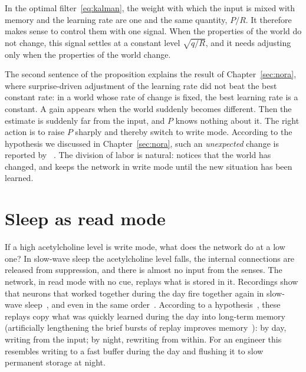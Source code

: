 \begin{keyblock}
\begin{proposition}
\label{prop:kalman}
In the optimal filter~\eqref{eq:kalman}, the weight with which the input is mixed with memory and the learning rate are one and the same quantity, $P/R$. It therefore makes sense to control them with one signal. When the properties of the world do not change, this signal settles at a constant level $\sqrt{q/R}$, and it needs adjusting only when the properties of the world change.
\end{proposition}
\end{keyblock}

The second sentence of the proposition explains the result of Chapter~\ref{sec:nora}, where surprise-driven adjustment of the learning rate did not beat the best constant rate: in a world whose rate of change is fixed, the best learning rate is a constant. A gain appears when the world suddenly becomes different. Then the estimate is suddenly far from the input, and $P$ knows nothing about it. The right action is to raise $P$ sharply and thereby switch to write mode. According to the hypothesis we discussed in Chapter~\ref{sec:nora}, such an \emph{unexpected} change is reported by ~\cite{YuDayan2005}. The division of labor is natural:  notices that the world has changed, and  keeps the network in write mode until the new situation has been learned.

\section{Sleep as read mode}

If a high acetylcholine level is write mode, what does the network do at a low one? In slow-wave sleep the acetylcholine level falls, the internal connections are released from suppression, and there is almost no input from the senses. The network, in read mode with no cue, replays what is stored in it. Recordings show that neurons that worked together during the day fire together again in slow-wave sleep~\cite{WilsonMcNaughton1994}, and even in the same order~\cite{Skaggs1996}. According to a hypothesis~\cite{Hasselmo1999}, these replays copy what was quickly learned during the day into long-term memory (artificially lengthening the brief bursts of replay improves memory~\cite{FernandezRuiz2019}): by day, writing from the input; by night, rewriting from within. For an engineer this resembles writing to a fast buffer during the day and flushing it to slow permanent storage at night.

